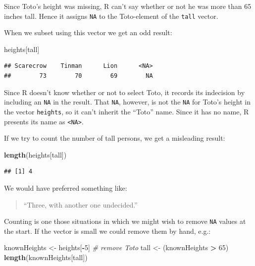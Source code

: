 \documentclass[]{book}
\makeatletter
\newenvironment{Shaded}{\begin{snugshade}}{\end{snugshade}}
\newcommand{\KeywordTok}[1]{\textcolor[rgb]{0.13,0.29,0.53}{\textbf{#1}}}
\newcommand{\DecValTok}[1]{\textcolor[rgb]{0.00,0.00,0.81}{#1}}
\newcommand{\StringTok}[1]{\textcolor[rgb]{0.31,0.60,0.02}{#1}}
\newcommand{\CommentTok}[1]{\textcolor[rgb]{0.56,0.35,0.01}{\textit{#1}}}
\newcommand{\OperatorTok}[1]{\textcolor[rgb]{0.81,0.36,0.00}{\textbf{#1}}}
\newcommand{\NormalTok}[1]{#1}
\newenvironment{kframe}{%
\medskip{}
\setlength{\fboxsep}{.8em}
 \def\at@end@of@kframe{}%
 \ifinner\ifhmode%
  \def\at@end@of@kframe{\end{minipage}}%
  \begin{minipage}{\columnwidth}%
 \fi\fi%
 \def\FrameCommand##1{\hskip\@totalleftmargin \hskip-\fboxsep
 \colorbox{shadecolor}{##1}\hskip-\fboxsep
     \hskip-\linewidth \hskip-\@totalleftmargin \hskip\columnwidth}%
 \MakeFramed {\advance\hsize-\width
   \@totalleftmargin\z@ \linewidth\hsize
   \@setminipage}}%
 {\par\unskip\endMakeFramed%
 \at@end@of@kframe}
\renewenvironment{Shaded}{\begin{kframe}}{\end{kframe}}
\theoremstyle{definition}
\theoremstyle{definition}
\theoremstyle{definition}
\theoremstyle{remark}
\makeatother
\begin{document}
Since Toto's height was missing, R can't say whether or not he was more
than 65 inches tall. Hence it assigns \texttt{NA} to the Toto-element of
the \texttt{tall} vector.

When we subset using this vector we get an odd result:

\begin{Shaded}
\begin{Highlighting}[]
\NormalTok{heights[tall]}
\end{Highlighting}
\end{Shaded}

\begin{verbatim}
## Scarecrow    Tinman      Lion      <NA> 
##        73        70        69        NA
\end{verbatim}

Since R doesn't know whether or not to select Toto, it records its
indecision by including an \texttt{NA} in the result. That \texttt{NA},
however, is not the \texttt{NA} for Toto's height in the vector
\texttt{heights}, so it can't inherit the ``Toto'' name. Since it has no
name, R presents its name as \texttt{\textless{}NA\textgreater{}}.

If we try to count the number of tall persons, we get a misleading
result:

\begin{Shaded}
\begin{Highlighting}[]
\KeywordTok{length}\NormalTok{(heights[tall])}
\end{Highlighting}
\end{Shaded}

\begin{verbatim}
## [1] 4
\end{verbatim}

We would have preferred something like:

\begin{quote}
``Three, with another one undecided.''
\end{quote}

Counting is one those situations in which we might wish to remove
\texttt{NA} values at the start. If the vector is small we could remove
them by hand, e.g.:

\begin{Shaded}
\begin{Highlighting}[]
\NormalTok{knownHeights <-}\StringTok{ }\NormalTok{heights[}\OperatorTok{-}\DecValTok{5}\NormalTok{]  }\CommentTok{# remove Toto}
\NormalTok{tall <-}\StringTok{ }\NormalTok{(knownHeights }\OperatorTok{>}\StringTok{ }\DecValTok{65}\NormalTok{)}
\KeywordTok{length}\NormalTok{(knownHeights[tall])}
\end{Highlighting}
\end{Shaded}
\end{document}

